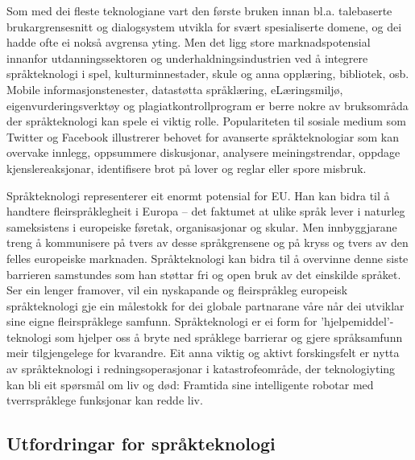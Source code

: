 \begin{multicols}{2}
Som med dei fleste teknologiane vart den første bruken innan bl.a. talebaserte brukargrensesnitt og dialogsystem utvikla for svært spesialiserte domene, og dei hadde ofte ei nokså avgrensa yting. Men det ligg store marknadspotensial innanfor utdanningssektoren og underhaldningsindustrien ved å integrere språkteknologi i spel, kulturminnestader, skule og anna opplæring, bibliotek, osb. Mobile informasjonstenester, datastøtta språklæring, eLæringsmiljø, eigenvurderingsverktøy og plagiatkontrollprogram er berre nokre av bruksområda der språkteknologi kan spele ei viktig rolle. Populariteten til sosiale medium som Twitter og Facebook illustrerer behovet for avanserte språkteknologiar som kan overvake innlegg, oppsummere diskusjonar, analysere meiningstrendar, oppdage kjenslereaksjonar, identifisere brot på lover og reglar eller spore misbruk.


Språkteknologi representerer eit enormt potensial for EU. Han kan bidra til å handtere fleirspråklegheit i Europa – det faktumet at ulike språk lever i naturleg sameksistens i europeiske føretak, organisasjonar og skular. Men innbyggjarane treng å kommunisere på tvers av desse språkgrensene og på kryss og tvers av den felles europeiske marknaden. Språkteknologi kan bidra til å overvinne denne siste barrieren samstundes som han støttar fri og open bruk av det einskilde språket. Ser ein lenger framover, vil ein nyskapande og fleirspråkleg europeisk språkteknologi gje ein målestokk for dei globale partnarane våre når dei utviklar sine eigne fleirspråklege samfunn. Språkteknologi er ei form for 'hjelpemiddel'-teknologi som hjelper oss å bryte ned språklege barrierar og gjere språksamfunn meir tilgjengelege for kvarandre. 
Eit anna viktig og aktivt forskingsfelt er nytta av språkteknologi i redningsoperasjonar i katastrofeområde, der teknologiyting kan bli eit spørsmål om liv og død: Framtida sine intelligente robotar med tverrspråklege funksjonar kan redde liv. 
 
\subsection{Utfordringar for språkteknologi}


\end{multicols}
